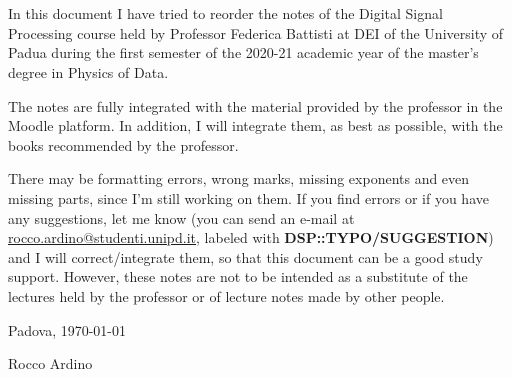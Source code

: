 \chapter*{}
\noindent In this document I have tried to reorder the notes of the Digital Signal Processing course held by Professor Federica Battisti at DEI of the University of Padua during the first semester of the 2020-21 academic year of the master's degree in Physics of Data.

The notes are fully integrated with the material provided by the professor in the Moodle platform. In addition, I will integrate them, as best as possible, with the books recommended by the professor.

There may be formatting errors, wrong marks, missing exponents and even missing parts, since I'm still working on them. If you find errors or if you have any suggestions, let me know (you can send an e-mail at \href{mailto:rocco.ardino@studenti.unipd.it}{rocco.ardino@studenti.unipd.it}, labeled with \textbf{DSP::TYPO/SUGGESTION}) and I will correct/integrate them, so that this document can be a good study support. However, these notes are not to be intended as a substitute of the lectures held by the professor or of lecture notes made by other people.

\vspace{1cm}
\noindent \hfill Padova, \today%

\noindent \hfill Rocco Ardino%
